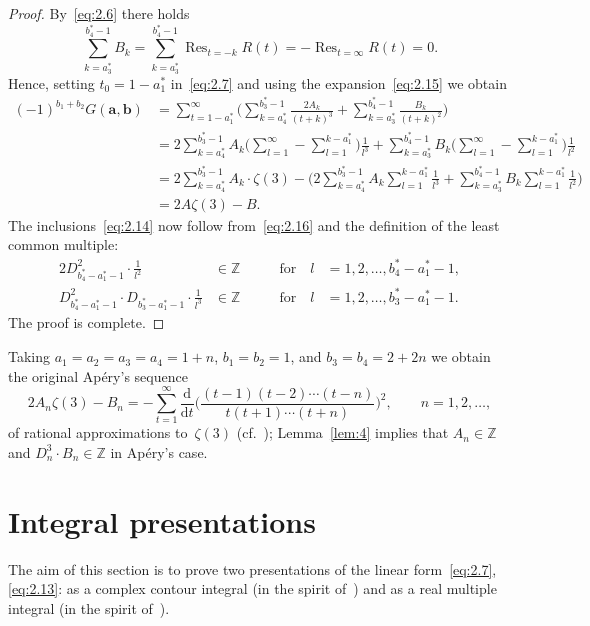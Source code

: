 \documentclass[a4paper,twoside]{article}
\numberwithin{equation}{section}
\renewcommand{\[}{\lfloor}
\renewcommand{\]}{\rfloor}
\newcommand{\<}{\langle}
\renewcommand{\>}{\rangle}
\renewcommand{\d}{\mathrm{d}}
\DeclareMathOperator{\Res}{Res}
\newcommand{\ba}{\boldsymbol a}
\newcommand{\bb}{\boldsymbol b}
\begin{document}
\begin{proof}
By~\eqref{eq:2.6} there holds
$$
\sum_{k=a_3^*}^{b_4^*-1}B_k
=\sum_{k=a_3^*}^{b_4^*-1}\Res_{t=-k}R(t)
=-\Res_{t=\infty}R(t)=0.
$$
Hence, setting $t_0=1-a_1^*$ in~\eqref{eq:2.7}
and using the expansion~\eqref{eq:2.15} we obtain
\begin{align*}
(-1)^{b_1+b_2}G(\ba,\bb)
&=\sum_{t=1-a_1^*}^\infty
\biggl(\sum_{k=a_4^*}^{b_3^*-1}\frac{2A_k}{(t+k)^3}
+\sum_{k=a_3^*}^{b_4^*-1}\frac{B_k}{(t+k)^2}\biggr)
\\
&=2\sum_{k=a_4^*}^{b_3^*-1}
A_k\biggl(\sum_{l=1}^\infty-\sum_{l=1}^{k-a_1^*}\biggr)\frac1{l^3}
+\sum_{k=a_3^*}^{b_4^*-1}
B_k\biggl(\sum_{l=1}^\infty-\sum_{l=1}^{k-a_1^*}\biggr)\frac1{l^2}
\\
&=2\sum_{k=a_4^*}^{b_3^*-1}A_k\cdot\zeta(3)
-\biggl(2\sum_{k=a_4^*}^{b_3^*-1}A_k\sum_{l=1}^{k-a_1^*}\frac1{l^3}
+\sum_{k=a_3^*}^{b_4^*-1}B_k\sum_{l=1}^{k-a_1^*}\frac1{l^2}\biggr)
\\
&=2A\zeta(3)-B.
\end{align*}
The inclusions~\eqref{eq:2.14} now follow from~\eqref{eq:2.16}
and the definition of the least common multiple:
\begin{alignat*}{2}
D_{b_4^*-a_1^*-1}^2\cdot\frac1{l^2}&\in\mathbb Z
\qquad&\mbox{for}\quad l&=1,2,\dots,b_4^*-a_1^*-1,
\\
D_{b_4^*-a_1^*-1}^2\cdot D_{b_3^*-a_1^*-1}
\cdot\frac1{l^3}&\in\mathbb Z
\qquad&\mbox{for}\quad l&=1,2,\dots,b_3^*-a_1^*-1.
\end{alignat*}
The proof is complete.
\end{proof}

Taking $a_1=a_2=a_3=a_4=1+n$, $b_1=b_2=1$, and $b_3=b_4=2+2n$
we obtain the original Ap\'ery's sequence
\begin{equation}
2A_n\zeta(3)-B_n
=-\sum_{t=1}^\infty\frac{\d}{\d t}
\biggl(\frac{(t-1)(t-2)\dotsb(t-n)}{t(t+1)\dotsb(t+n)}\biggr)^2,
\qquad n=1,2,\dots,
\label{eq:2.17}
\end{equation}
of rational approximations to~$\zeta(3)$
(cf.~\cite{Gu,Ne1}); Lemma~\ref{lem:4} implies that
$A_n\in\mathbb Z$ and $D_n^3\cdot B_n\in\mathbb Z$ in Ap\'ery's case.

\section{Integral presentations}
\label{sec:3}
The aim of this section is to prove two presentations
of the linear form~\eqref{eq:2.7}, \eqref{eq:2.13}:
as a complex contour integral
(in the spirit of~\cite{Gu,Ne1})
and as a real multiple integral
(in the spirit of~\cite{Be,Ha5,RV3}).
\end{document}
